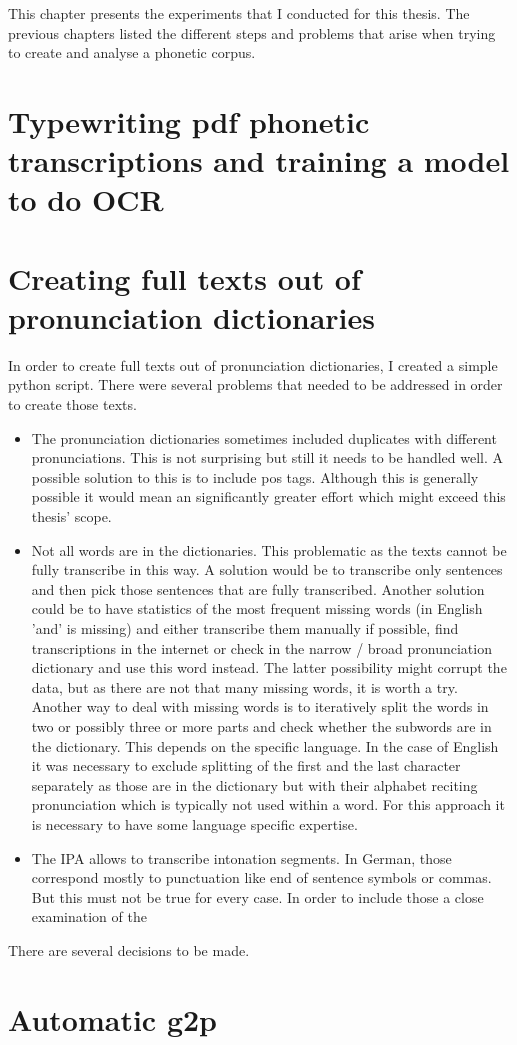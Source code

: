 
\label{chap:4_exp}
This chapter presents the experiments that I conducted for this thesis. The previous chapters listed the different steps and problems that arise when trying to create and analyse a phonetic corpus. 

\section{Typewriting pdf phonetic transcriptions and training a model to do OCR}


\section{Creating full texts out of pronunciation dictionaries}
In order to create full texts out of pronunciation dictionaries, I created a simple python script. There were several problems that needed to be addressed in order to create those texts. 

\begin{itemize}
\item The pronunciation dictionaries sometimes included duplicates with different pronunciations. This is not surprising but still it needs to be handled well. A possible solution to this is to include \ac{pos} tags. Although this is generally possible it would  mean an significantly greater effort which might exceed this thesis' scope. 
\item Not all words are in the dictionaries. This problematic as the texts cannot be fully transcribe in this way. A solution would be to transcribe only sentences and then pick those sentences that are fully transcribed. Another solution could be to have statistics of the most frequent missing words (in English 'and' is missing) and either transcribe them manually if possible, find transcriptions in the internet or check in the narrow / broad pronunciation dictionary and use this word instead. The latter possibility might corrupt the data, but as there are not that many missing words, it is worth a try.
Another way to deal with missing words is to iteratively split the words in two or possibly three or more parts and check whether the subwords are in the dictionary. This depends on the specific language. In the case of English it was necessary to exclude splitting of the first and the last character separately as those are in the dictionary but with their alphabet reciting pronunciation which is typically not used within a word. For this approach it is necessary to have some language specific expertise.
\item The IPA allows to transcribe intonation segments. In German, those correspond mostly to punctuation like end of sentence symbols or commas. But this must not be true for every case. In order to include those a close examination of the 
\end{itemize}

There are several decisions to be made. 

\section{Automatic \ac{g2p}}
